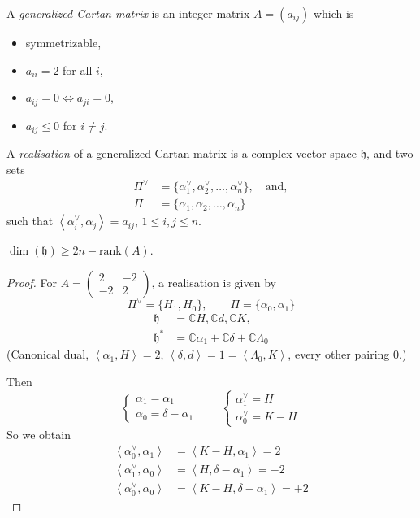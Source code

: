 \begin{definition}
\label{definition-generalized-Cartan-matrix}
A {\it generalized Cartan matrix} is an integer matrix $A=(a_{ij})$ 
which is
\begin{itemize}
\item symmetrizable,
\item $a_{ii}=2$ for all $i$,
\item $a_{ij}=0 \iff a_{ji}=0$,
\item $a_{ij}\leq 0$ for $i \neq j$.
\end{itemize}
\end{definition}

\begin{definition}
\label{definition-realisation}
A {\it realisation} of a generalized Cartan matrix is a complex vector space
 $\mathfrak{h}$, and two sets
\begin{align*}
\Pi^\vee&=\{\alpha_1^\vee, \alpha_2^\vee,\ldots,\alpha_n^\vee\},\quad
\text{and},\\
\Pi&=\{\alpha_1,\alpha_2,\ldots,\alpha_n\}
\end{align*}
such that $\left<\alpha_i^\vee,\alpha_j\right>=a_{ij}$, $1\leq i,j\leq n$.
\end{definition}

\begin{exercise}
\label{exercise-realisation}
$\dim(\mathfrak{h})\geq 2n-\text{rank}(A)$.
\end{exercise}

\begin{proof}
For $A=\begin{pmatrix}
2&-2\\ 
-2&2
\end{pmatrix}$, a realisation is given by
$$
\Pi^\vee=\{H_1,H_0\},\qquad \Pi=\{\alpha_0,\alpha_1\}
$$
\begin{align*}
\mathfrak{h}&=\mathbb{C}H,\mathbb{C}d,\mathbb{C}K,\\
\mathfrak{h}^*&=\mathbb{C}\alpha_1+\mathbb{C}\delta+\mathbb{C}\Lambda_0
\end{align*}
(Canonical dual, $\left<\alpha_1,H\right>=2$, 
$\left<\delta,d\right>=1=\left<\Lambda_0,K\right>$, every other pairing $0$.)

Then
$$
\begin{cases}
\alpha_1=\alpha_1\\
\alpha_0=\delta-\alpha_1
\end{cases}\qquad 
\begin{cases}
\alpha_1^\vee=H \\
\alpha_0^\vee = K-H
\end{cases}
$$
So we obtain
\begin{align*}
\left<\alpha_0^\vee,\alpha_1\right>&=\left<K-H,\alpha_1\right>=2\\
\left<\alpha_1^\vee,\alpha_0\right>&=\left<H,\delta-\alpha_1\right>=-2\\
\left<\alpha_0^\vee,\alpha_0\right>&=\left<K-H,\delta-\alpha_1\right>=+2
\end{align*}

\end{proof}

